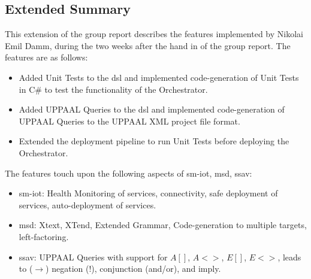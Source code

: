 \subsection*{Extended Summary}

This extension of the group report describes the features implemented by Nikolai Emil Damm, during the two weeks after the hand in of the group report. The features are as follows:

\begin{itemize}
    \item Added Unit Tests to the \acrshort{dsl} and implemented code-generation of Unit Tests in C\# to test the functionality of the Orchestrator.
    \item Added UPPAAL Queries to the \acrshort{dsl} and implemented code-generation of UPPAAL Queries to the UPPAAL XML project file format.
    \item Extended the deployment pipeline to run Unit Tests before deploying the Orchestrator.
\end{itemize}

\noindent The features touch upon the following aspects of \acrshort{sm-iot}, \acrshort{msd}, \acrshort{ssav}:

\begin{itemize}
    \item \acrshort{sm-iot}: Health Monitoring of services, connectivity, safe deployment of services, auto-deployment of services.
    \item \acrshort{msd}: Xtext, XTend, Extended Grammar, Code-generation to multiple targets, left-factoring.  
    \item \acrshort{ssav}: UPPAAL Queries with support for $A[]$, $A<>$, $E[]$, $E<>$, leads to ($\rightarrow$) negation ($!$), conjunction (and/or), and imply.
\end{itemize}


